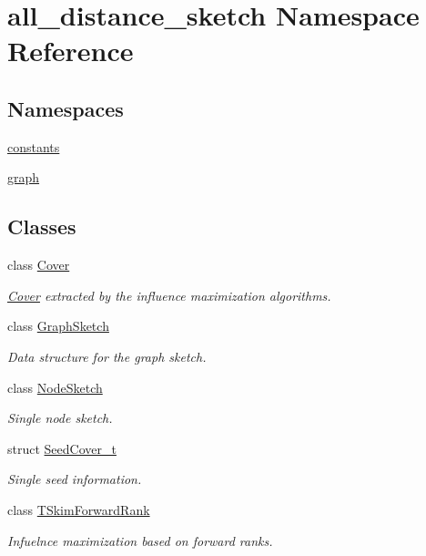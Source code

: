 \hypertarget{namespaceall__distance__sketch}{}\section{all\+\_\+distance\+\_\+sketch Namespace Reference}
\label{namespaceall__distance__sketch}
\subsection*{Namespaces}
\begin{DoxyCompactItemize}
\item 
 \hyperlink{namespaceall__distance__sketch_1_1constants}{constants}
\item 
 \hyperlink{namespaceall__distance__sketch_1_1graph}{graph}
\end{DoxyCompactItemize}
\subsection*{Classes}
\begin{DoxyCompactItemize}
\item 
class \hyperlink{classall__distance__sketch_1_1Cover}{Cover}
\begin{DoxyCompactList}\small\item\em \hyperlink{classall__distance__sketch_1_1Cover}{Cover} extracted by the influence maximization algorithms. \end{DoxyCompactList}\item 
class \hyperlink{classall__distance__sketch_1_1GraphSketch}{Graph\+Sketch}
\begin{DoxyCompactList}\small\item\em Data structure for the graph sketch. \end{DoxyCompactList}\item 
class \hyperlink{classall__distance__sketch_1_1NodeSketch}{Node\+Sketch}
\begin{DoxyCompactList}\small\item\em Single node sketch. \end{DoxyCompactList}\item 
struct \hyperlink{structall__distance__sketch_1_1SeedCover__t}{Seed\+Cover\+\_\+t}
\begin{DoxyCompactList}\small\item\em Single seed information. \end{DoxyCompactList}\item 
class \hyperlink{classall__distance__sketch_1_1TSkimForwardRank}{T\+Skim\+Forward\+Rank}
\begin{DoxyCompactList}\small\item\em Infuelnce maximization based on forward ranks. \end{DoxyCompactList}\end{DoxyCompactItemize}
